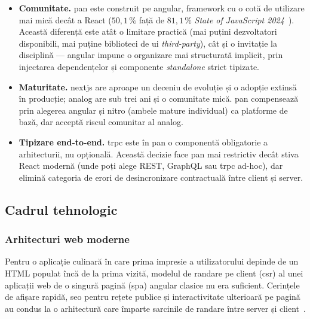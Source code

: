 \begin{itemize}
  \item \textbf{Comunitate.} \gls{pan} este construit pe \gls{angular}, framework cu o cotă de utilizare mai mică decât a React (\(50{,}1\,\%\) față de \(81{,}1\,\%\) \textit{State of JavaScript 2024}~\cite{stateOfJS2024}). Această diferență este atât o limitare practică (mai puțini dezvoltatori disponibili, mai puține biblioteci de \acrshort{ui} \textit{third-party}), cât și o invitație la disciplină --- \gls{angular} impune o organizare mai structurată implicit, prin injectarea dependențelor și componente \textit{standalone} strict tipizate.

  \item \textbf{Maturitate.} \gls{nextjs} are aproape un deceniu de evoluție și o adopție extinsă în producție; \gls{analog} are sub trei ani și o comunitate mică. \gls{pan} compensează prin alegerea \gls{angular} și \gls{nitro} (ambele mature individual) ca platforme de bază, dar acceptă riscul comunitar al \gls{analog}.

  \item \textbf{Tipizare end-to-end.} \gls{trpc} este în \gls{pan} o componentă obligatorie a arhitecturii, nu opțională. Această decizie face \gls{pan} mai restrictiv decât stiva React modernă (unde poți alege REST, GraphQL sau \gls{trpc} ad-hoc), dar elimină categoria de erori de desincronizare contractuală între client și server.
\end{itemize}

\subsection{Cadrul tehnologic}\label{sec:cadrul-tehnologic}

\subsubsection{Arhitecturi web moderne}\label{subsec:arhitecturi-web}

Pentru o aplicație culinară în care prima impresie a utilizatorului depinde de un HTML populat încă de la prima vizită, modelul de randare pe client (\acrshort{csr}) al unei aplicații web de o singură pagină (\acrshort{spa}) \gls{angular} clasice nu era suficient.
Cerințele de afișare rapidă, \acrshort{seo} pentru rețete publice și interactivitate ulterioară pe pagină au condus la o arhitectură care împarte sarcinile de \gls{randare} între server și client~\cite{analog,nitro}.

